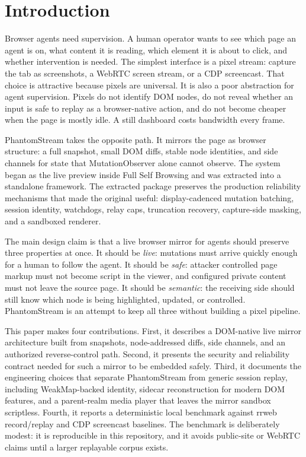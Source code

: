\documentclass[conference]{IEEEtran}
\begin{document}
\section{Introduction}

Browser agents need supervision. A human operator wants to see which page an
agent is on, what content it is reading, which element it is about to click, and
whether intervention is needed. The simplest interface is a pixel stream: capture
the tab as screenshots, a WebRTC screen stream, or a CDP screencast. That choice
is attractive because pixels are universal. It is also a poor abstraction for
agent supervision. Pixels do not identify DOM nodes, do not reveal whether an
input is safe to replay as a browser-native action, and do not become cheaper
when the page is mostly idle. A still dashboard costs bandwidth every frame.

PhantomStream takes the opposite path. It mirrors the page as browser structure:
a full snapshot, small DOM diffs, stable node identities, and side channels for
state that MutationObserver alone cannot observe. The system began as the live
preview inside Full Self Browsing and was extracted into a standalone framework.
The extracted package preserves the production reliability mechanisms that made
the original useful: display-cadenced mutation batching, session identity,
watchdogs, relay caps, truncation recovery, capture-side masking, and a
sandboxed renderer.

The main design claim is that a live browser mirror for agents should preserve
three properties at once. It should be \emph{live}: mutations must arrive quickly
enough for a human to follow the agent. It should be \emph{safe}: attacker
controlled page markup must not become script in the viewer, and configured
private content must not leave the source page. It should be \emph{semantic}:
the receiving side should still know which node is being highlighted, updated, or
controlled. PhantomStream is an attempt to keep all three without building a
pixel pipeline.

This paper makes four contributions. First, it describes a DOM-native live mirror
architecture built from snapshots, node-addressed diffs, side channels, and an
authorized reverse-control path. Second, it presents the security and reliability
contract needed for such a mirror to be embedded safely. Third, it documents the
engineering choices that separate PhantomStream from generic session replay,
including WeakMap-backed identity, sidecar reconstruction for modern DOM
features, and a parent-realm media player that leaves the mirror sandbox
scriptless. Fourth, it reports a deterministic local benchmark against rrweb
record/replay and CDP screencast baselines. The benchmark is deliberately modest:
it is reproducible in this repository, and it avoids public-site or WebRTC claims
until a larger replayable corpus exists.
\end{document}
